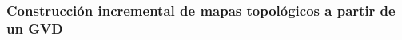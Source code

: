 




\subsubsection{Construcción incremental de mapas topológicos a partir de un GVD}
\cite{Liu2015}










